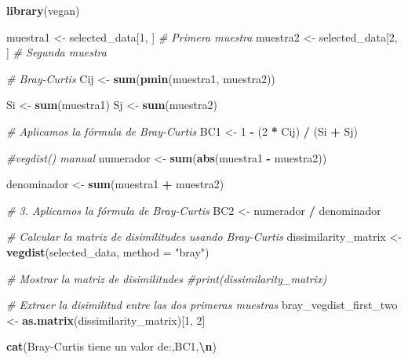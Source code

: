 \documentclass[
]{article}
\newenvironment{Shaded}{\begin{snugshade}}{\end{snugshade}}
\newcommand{\AttributeTok}[1]{\textcolor[rgb]{0.13,0.29,0.53}{#1}}
\newcommand{\CommentTok}[1]{\textcolor[rgb]{0.56,0.35,0.01}{\textit{#1}}}
\newcommand{\DecValTok}[1]{\textcolor[rgb]{0.00,0.00,0.81}{#1}}
\newcommand{\FunctionTok}[1]{\textcolor[rgb]{0.13,0.29,0.53}{\textbf{#1}}}
\newcommand{\NormalTok}[1]{#1}
\newcommand{\OtherTok}[1]{\textcolor[rgb]{0.56,0.35,0.01}{#1}}
\newcommand{\SpecialCharTok}[1]{\textcolor[rgb]{0.81,0.36,0.00}{\textbf{#1}}}
\newcommand{\StringTok}[1]{\textcolor[rgb]{0.31,0.60,0.02}{#1}}
\begin{document}
\begin{Shaded}
\begin{Highlighting}[]
\FunctionTok{library}\NormalTok{(vegan)}


\NormalTok{muestra1 }\OtherTok{\textless{}{-}}\NormalTok{ selected\_data[}\DecValTok{1}\NormalTok{, ]  }\CommentTok{\# Primera muestra}
\NormalTok{muestra2 }\OtherTok{\textless{}{-}}\NormalTok{ selected\_data[}\DecValTok{2}\NormalTok{, ]  }\CommentTok{\# Segunda muestra}

\CommentTok{\# Bray{-}Curtis}
\NormalTok{Cij }\OtherTok{\textless{}{-}} \FunctionTok{sum}\NormalTok{(}\FunctionTok{pmin}\NormalTok{(muestra1, muestra2))}

\NormalTok{Si }\OtherTok{\textless{}{-}} \FunctionTok{sum}\NormalTok{(muestra1)}
\NormalTok{Sj }\OtherTok{\textless{}{-}} \FunctionTok{sum}\NormalTok{(muestra2)}

\CommentTok{\# Aplicamos la fórmula de Bray{-}Curtis}
\NormalTok{BC1 }\OtherTok{\textless{}{-}} \DecValTok{1} \SpecialCharTok{{-}}\NormalTok{ (}\DecValTok{2} \SpecialCharTok{*}\NormalTok{ Cij) }\SpecialCharTok{/}\NormalTok{ (Si }\SpecialCharTok{+}\NormalTok{ Sj)}

\CommentTok{\#vegdist() manual}
\NormalTok{numerador }\OtherTok{\textless{}{-}} \FunctionTok{sum}\NormalTok{(}\FunctionTok{abs}\NormalTok{(muestra1 }\SpecialCharTok{{-}}\NormalTok{ muestra2))}

\NormalTok{denominador }\OtherTok{\textless{}{-}} \FunctionTok{sum}\NormalTok{(muestra1 }\SpecialCharTok{+}\NormalTok{ muestra2)}

\CommentTok{\# 3. Aplicamos la fórmula de Bray{-}Curtis}
\NormalTok{BC2 }\OtherTok{\textless{}{-}}\NormalTok{ numerador }\SpecialCharTok{/}\NormalTok{ denominador}



\CommentTok{\# Calcular la matriz de disimilitudes usando Bray{-}Curtis}
\NormalTok{dissimilarity\_matrix }\OtherTok{\textless{}{-}} \FunctionTok{vegdist}\NormalTok{(selected\_data, }\AttributeTok{method =} \StringTok{"bray"}\NormalTok{)}

\CommentTok{\# Mostrar la matriz de disimilitudes}
\CommentTok{\#print(dissimilarity\_matrix)}

\CommentTok{\# Extraer la disimilitud entre las dos primeras muestras}
\NormalTok{bray\_vegdist\_first\_two }\OtherTok{\textless{}{-}} \FunctionTok{as.matrix}\NormalTok{(dissimilarity\_matrix)[}\DecValTok{1}\NormalTok{, }\DecValTok{2}\NormalTok{]}


\FunctionTok{cat}\NormalTok{(}\StringTok{\textquotesingle{}Bray{-}Curtis tiene un valor de:\textquotesingle{}}\NormalTok{,BC1,}\StringTok{\textquotesingle{}}\SpecialCharTok{\textbackslash{}n}\StringTok{\textquotesingle{}}\NormalTok{)}
\end{Highlighting}
\end{Shaded}
\end{document}

